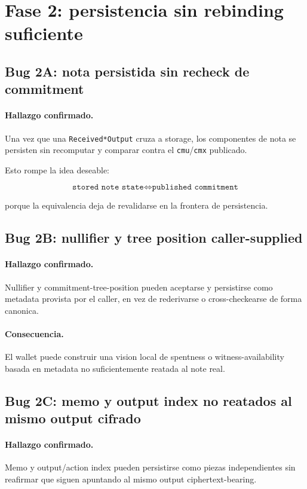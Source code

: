 \documentclass[11pt,a4paper]{article}
\begin{document}
\section{Fase 2: persistencia sin rebinding suficiente}

\subsection{Bug 2A: nota persistida sin recheck de commitment}

\paragraph{Hallazgo confirmado.}
Una vez que una \texttt{Received*Output} cruza a storage, los componentes de
nota se persisten sin recomputar y comparar contra el \texttt{cmu}/\texttt{cmx}
publicado.

Esto rompe la idea deseable:

\[
\texttt{stored note state} \Longleftrightarrow \texttt{published commitment}
\]

porque la equivalencia deja de revalidarse en la frontera de persistencia.

\subsection{Bug 2B: nullifier y tree position caller-supplied}

\paragraph{Hallazgo confirmado.}
Nullifier y commitment-tree-position pueden aceptarse y persistirse como
metadata provista por el caller, en vez de rederivarse o cross-checkearse de
forma canonica.

\paragraph{Consecuencia.}
El wallet puede construir una vision local de spentness o witness-availability
basada en metadata no suficientemente reatada al note real.

\subsection{Bug 2C: memo y output index no reatados al mismo output cifrado}

\paragraph{Hallazgo confirmado.}
Memo y output/action index pueden persistirse como piezas independientes sin
reafirmar que siguen apuntando al mismo output ciphertext-bearing.
\end{document}
